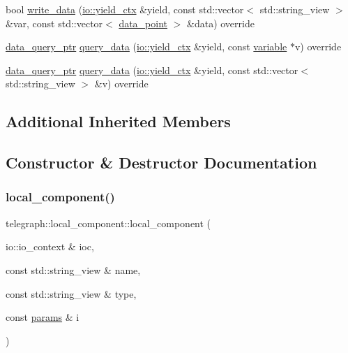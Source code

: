 \begin{DoxyCompactItemize}
\item 
bool \hyperlink{classtelegraph_1_1local__component_a572a4116130a4b7ad270701eba2af0e7}{write\+\_\+data} (\hyperlink{structboost_1_1asio_1_1yield__ctx}{io\+::yield\+\_\+ctx} \&yield, const std\+::vector$<$ std\+::string\+\_\+view $>$ \&var, const std\+::vector$<$ \hyperlink{classtelegraph_1_1data__point}{data\+\_\+point} $>$ \&data) override
\item 
\hyperlink{namespacetelegraph_a6ffe775ac48dca2a4013b53d692199c8}{data\+\_\+query\+\_\+ptr} \hyperlink{classtelegraph_1_1local__component_a4410ca44a41de1c139273efd31f281c4}{query\+\_\+data} (\hyperlink{structboost_1_1asio_1_1yield__ctx}{io\+::yield\+\_\+ctx} \&yield, const \hyperlink{classtelegraph_1_1variable}{variable} $\ast$v) override
\item 
\hyperlink{namespacetelegraph_a6ffe775ac48dca2a4013b53d692199c8}{data\+\_\+query\+\_\+ptr} \hyperlink{classtelegraph_1_1local__component_ad8c3abb4f9e6ab31b0590beac901eec5}{query\+\_\+data} (\hyperlink{structboost_1_1asio_1_1yield__ctx}{io\+::yield\+\_\+ctx} \&yield, const std\+::vector$<$ std\+::string\+\_\+view $>$ \&v) override
\end{DoxyCompactItemize}
\subsection*{Additional Inherited Members}


\subsection{Constructor \& Destructor Documentation}
\mbox{\label{classtelegraph_1_1local__component_a4cd9cd1728ba53391553b81dbb4e3494}} 
\subsubsection{\texorpdfstring{local\+\_\+component()}{local\_component()}}
{\footnotesize\ttfamily telegraph\+::local\+\_\+component\+::local\+\_\+component (\begin{DoxyParamCaption}\item[{io\+::io\+\_\+context \&}]{ioc,  }\item[{const std\+::string\+\_\+view \&}]{name,  }\item[{const std\+::string\+\_\+view \&}]{type,  }\item[{const \hyperlink{classtelegraph_1_1params}{params} \&}]{i }\end{DoxyParamCaption})}




